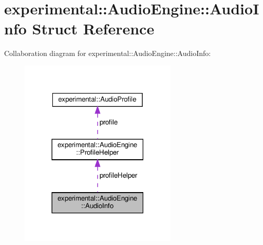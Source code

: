 \hypertarget{structexperimental_1_1AudioEngine_1_1AudioInfo}{}\section{experimental\+:\+:Audio\+Engine\+:\+:Audio\+Info Struct Reference}
\label{structexperimental_1_1AudioEngine_1_1AudioInfo}


Collaboration diagram for experimental\+:\+:Audio\+Engine\+:\+:Audio\+Info\+:
\nopagebreak
\begin{figure}[H]
\begin{center}
\leavevmode
\includegraphics[width=213pt]{structexperimental_1_1AudioEngine_1_1AudioInfo__coll__graph}
\end{center}
\end{figure}
